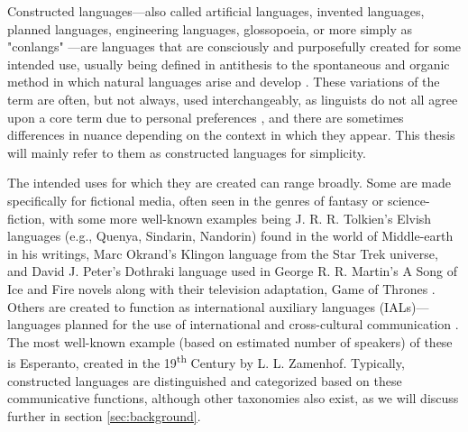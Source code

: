 \documentclass[12pt,a4paper]{article}
\numberwithin{figure}{section}
\numberwithin{table}{section}
\numberwithin{definition}{section}
\begin{document}

Constructed languages---also called artificial languages, invented languages, planned languages, engineering languages, glossopoeia, or more simply as "conlangs" \parencite{douglas2015book}---are languages that are consciously and purposefully created for some intended use, usually being defined in antithesis to the spontaneous and organic method in which natural languages arise and develop \parencite{sanders2016article}. These variations of the term are often, but not always, used interchangeably, as linguists do not all agree upon a core term due to personal preferences \parencite{Adelman2014article}, and there are sometimes differences in nuance depending on the context in which they appear. This thesis will mainly refer to them as constructed languages for simplicity.

The intended uses for which they are created can range broadly. Some are made specifically for fictional media, often seen in the genres of fantasy or science-fiction, with some more well-known examples being J. R. R. Tolkien's Elvish languages (e.g., Quenya, Sindarin, Nandorin) found in the world of Middle-earth in his writings, Marc Okrand's Klingon language from the Star Trek universe, and David J. Peter's Dothraki language used in George R. R. Martin's A Song of Ice and Fire novels along with their television adaptation, Game of Thrones \parencite{punske2020book}. Others are created to function as international auxiliary languages (IALs)---languages planned for the use of international and cross-cultural communication \parencite{Gobbo2016article}. The most well-known example (based on estimated number of speakers) of these is Esperanto, created in the 19\textsuperscript{th} Century by L. L. Zamenhof. Typically, constructed languages are distinguished and categorized based on these communicative functions, although other taxonomies also exist, as we will discuss further in section \ref{sec:background}. 

\end{document}
